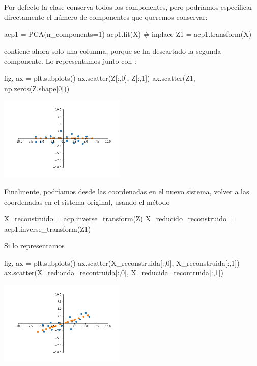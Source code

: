 \documentclass{beamer}
\begin{document}
\begin{frame}[fragile]
Por defecto la clase  conserva todos los componentes, pero
podríamos especificar directamente el número de componentes que
queremos conservar:
  \begin{pyblock}
acp1 = PCA(n_components=1)
acp1.fit(X) # inplace
Z1 = acp1.transform(X)
\end{pyblock}
  contiene ahora solo una columna, porque se ha
descartado la segunda componente. 
Lo representamos junto con :
{\footnotesize
\begin{pyverbatim}
fig, ax = plt.subplots()
ax.scatter(Z[:,0], Z[:,1])
ax.scatter(Z1, np.zeros(Z.shape[0]))
\end{pyverbatim}
}
\begin{center}
\includegraphics[width=6cm]{z1z2_reducido_matplotlib.png}
\end{center}
\end{frame}
\begin{frame}[fragile]
Finalmente, podríamos desde las coordenadas en el nuevo sistema,
volver a las coordenadas en el sistema original, usando el método 
  \begin{pyblock}
X_reconstruido = acp.inverse_transform(Z)
X_reducido_reconstruido = acp1.inverse_transform(Z1)
\end{pyblock}
 Si lo representamos
{\footnotesize
\begin{pyverbatim}
fig, ax = plt.subplots()
ax.scatter(X_reconstruida[:,0], X_reconstruida[:,1])
ax.scatter(X_reducida_recontruida[:,0], X_reducida_recontruida[:,1])
\end{pyverbatim}
}
\begin{center}
\includegraphics[width=6cm]{x1x2_reducido_matplotlib.png}
\end{center}
\end{frame}
\end{document}
